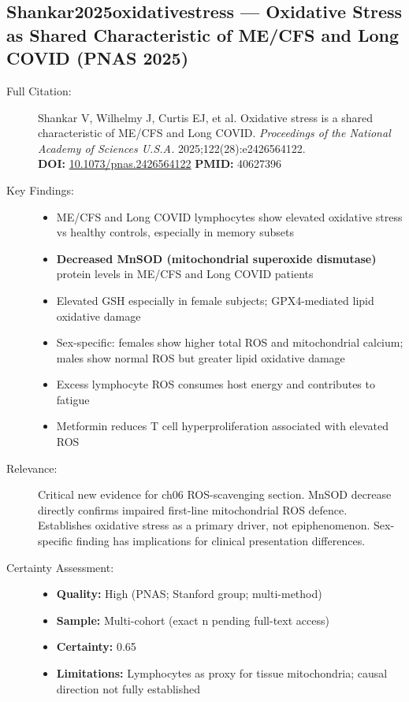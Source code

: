 \subsection*{Shankar2025oxidativestress --- Oxidative Stress as Shared Characteristic of ME/CFS and Long COVID (PNAS 2025)}
\begin{description}
    \item[Full Citation:] Shankar V, Wilhelmy J, Curtis EJ, et al. Oxidative stress is a shared characteristic of ME/CFS and Long COVID. \textit{Proceedings of the National Academy of Sciences U.S.A.} 2025;122(28):e2426564122.\\
    \textbf{DOI:} \href{https://doi.org/10.1073/pnas.2426564122}{10.1073/pnas.2426564122} \quad \textbf{PMID:} 40627396
    \item[Key Findings:]
    \begin{itemize}
        \item ME/CFS and Long COVID lymphocytes show elevated oxidative stress vs healthy controls, especially in memory subsets
        \item \textbf{Decreased MnSOD (mitochondrial superoxide dismutase)} protein levels in ME/CFS and Long COVID patients
        \item Elevated GSH especially in female subjects; GPX4-mediated lipid oxidative damage
        \item Sex-specific: females show higher total ROS and mitochondrial calcium; males show normal ROS but greater lipid oxidative damage
        \item Excess lymphocyte ROS consumes host energy and contributes to fatigue
        \item Metformin reduces T cell hyperproliferation associated with elevated ROS
    \end{itemize}
    \item[Relevance:] Critical new evidence for ch06 ROS-scavenging section. MnSOD decrease directly confirms impaired first-line mitochondrial ROS defence. Establishes oxidative stress as a primary driver, not epiphenomenon. Sex-specific finding has implications for clinical presentation differences.
    \item[Certainty Assessment:]
    \begin{itemize}
        \item \textbf{Quality:} High (PNAS; Stanford group; multi-method)
        \item \textbf{Sample:} Multi-cohort (exact n pending full-text access)
        \item \textbf{Certainty:} 0.65
        \item \textbf{Limitations:} Lymphocytes as proxy for tissue mitochondria; causal direction not fully established
    \end{itemize}
\end{description}

